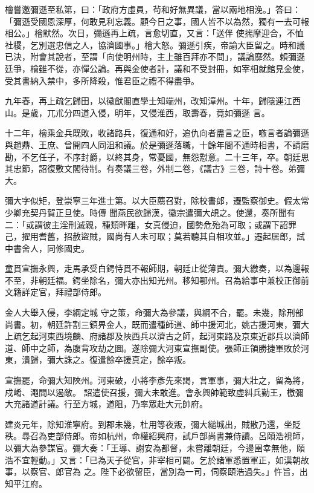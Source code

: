 \begin{pinyinscope}
 檜嘗邀彌遜至私第，曰：「政府方虛員，茍和好無異議，當以兩地相浼。」答曰：「彌遜受國恩深厚，何敢見利忘義。顧今日之事，國人皆不以為然，獨有一去可報相公。」檜默然。次日，彌遜再上疏，言愈切直，又言：「送伴
 使揣摩迎合，不恤社稷，乞別選忠信之人，協濟國事。」檜大怒。彌遜引疾，帝諭大臣留之。時和議已決，附會其說者，至謂「向使明州時，主上雖百拜亦不問」，議論靡然。賴彌遜廷爭，檜雖不從，亦憚公論。再與金使者計，議和不受封冊，如宰相就館見金使，受其書納入禁中，多所降殺，惟君臣之禮不得盡爭。



 九年春，再上疏乞歸田，以徽猷閣直學士知端州，改知漳州。十年，歸隱連江西山。是歲，兀朮分四道入侵，明年，又侵淮西，取壽春，竟如彌遜
 言。



 十二年，檜乘金兵既敗，收諸路兵，復通和好，追仇向者盡言之臣，嗾言者論彌遜與趙鼎、王庶、曾開四人同沮和議。於是彌遜落職，十餘年間不通時相書，不請磨勘，不乞任子，不序封爵，以終其身，常憂國，無怨懟意。二十三年，卒。朝廷思其忠節，詔復敷文閣待制。有奏議三卷，外制二卷，《議古》三卷，詩十卷。弟彌大。



 彌大字似矩，登崇寧三年進士第。以大臣薦召對，除校書郎，遷監察御史。假太常少卿充契丹賀正旦使。時傳
 聞燕民欲歸漢，徽宗遣彌大覘之。使還，奏所聞有二：「或謂彼主淫刑滅親，種類畔離，女真侵迫，國勢危殆為可取；或謂下詔罪己，擢用耆舊，招赦盜賊，國尚有人未可取；莫若聽其自相攻並。」遷起居郎，試中書舍人，同修國史。



 童貫宣撫永興，走馬承受白鍔恃貫不報師期，朝廷止從薄責。彌大繳奏，以為邊報不至，非朝廷福。鍔坐除名，彌大亦出知光州。移知鄂州。召為給事中兼校正御前文籍詳定官，拜禮部侍郎。



 金人大舉入侵，李綱定城
 守之策，命彌大為參議，與綱不合，罷。未幾，除刑部尚書。初，朝廷許割三鎮畀金人，既而遣種師道、師中援河北，姚古援河東，彌大上疏乞起河東西境麟、府諸郡及陜西兵以濟古之師，起河東路及京東近郡兵以濟師道、師中之師，為腹背攻劫之圖。遂除彌大河東宣撫副使。張師正領勝捷軍敗於河東，潰歸，彌大誅之。復遣餘卒援真定，餘卒叛。



 宣撫罷，命彌大知陜州。河東破，小將李彥先來謁，言軍事，彌大壯之，留為將，戍崤、澠間以遏敵。
 詔遣使召援，彌大未敢進。會永興帥範致虛糾兵勤王，檄彌大充諸道計議。行至方城，道阻，乃率眾赴大元帥府。



 建炎元年，除知淮寧府。到郡未幾，杜用等夜叛，彌大縋城出，賊散乃還，坐貶秩。尋召為吏部侍郎。帝如杭州，命權紹興府，試戶部尚書兼侍讀。呂頤浩視師，以彌大為參謀官。彌大奏：「王導、謝安為都督，未嘗離朝廷，今邊圉幸無他，頤浩不宜輕動。」又言：「已為天子從官，非宰相可闢。乞於諸軍悉置軍正，如漢朝故事，以察官、郎官為
 之。陛下必欲留臣，當別為一司，伺察頤浩過失。」忤旨，出知平江府。




\end{pinyinscope}
